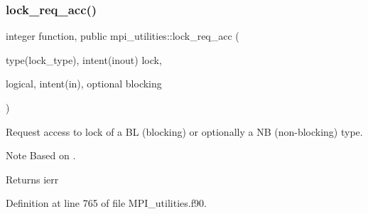 \subsubsection{\texorpdfstring{lock\+\_\+req\+\_\+acc()}{lock\_req\_acc()}}
{\footnotesize\ttfamily integer function, public mpi\+\_\+utilities\+::lock\+\_\+req\+\_\+acc (\begin{DoxyParamCaption}\item[{type(lock\+\_\+type), intent(inout)}]{lock,  }\item[{logical, intent(in), optional}]{blocking }\end{DoxyParamCaption})}



Request access to lock of a BL (blocking) or optionally a NB (non-\/blocking) type. 

\begin{DoxyNote}{Note}
Based on \cite{RossAtomicIO}.
\end{DoxyNote}
\begin{DoxyReturn}{Returns}
ierr 
\end{DoxyReturn}


Definition at line 765 of file M\+P\+I\+\_\+utilities.\+f90.

